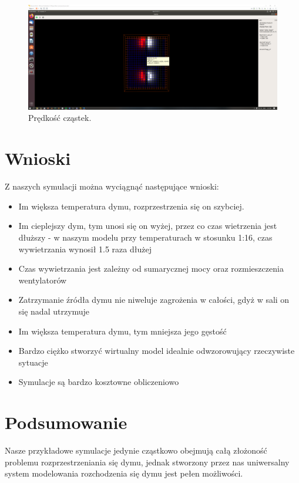 \documentclass{article}
\begin{document}
        \begin{figure}[ht!]
            \centering
            \includegraphics[scale = 0.15]{mgui_2.png}
            \caption{Prędkość cząstek.}
        \end{figure}
    
    \newpage
    
    \pagebreak
    
    \vspace{100mm}
    \medskip
    \medskip
    
    \section{Wnioski}
    Z naszych symulacji można wyciągnąć następujące wnioski:
    \begin{itemize}
        \item Im większa temperatura dymu, rozprzestrzenia się on szybciej.
        \item Im cieplejszy dym, tym unosi się on wyżej, przez co czas wietrzenia jest dłuższy - w naszym modelu przy temperaturach w stosunku 1:16, czas wywietrzania wynosił 1.5 raza dłużej
        \item Czas wywietrzania jest zależny od sumarycznej mocy oraz rozmieszczenia wentylatorów
        \item Zatrzymanie źródła dymu nie niweluje zagrożenia w całości, gdyż w sali on się nadal utrzymuje
        \item Im większa temperatura dymu, tym mniejsza jego gęstość 
        \item Bardzo ciężko stworzyć wirtualny model idealnie odwzorowujący rzeczywiste sytuacje
        \item Symulacje są bardzo kosztowne obliczeniowo
    \end{itemize}
    
    \section{Podsumowanie}
    Nasze przykładowe symulacje jedynie cząstkowo obejmują całą złożoność problemu rozprzestrzeniania się dymu, jednak stworzony przez nas uniwersalny system modelowania rozchodzenia się dymu jest pełen możliwości. 
\end{document}
